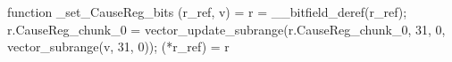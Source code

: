 function _set_CauseReg_bits (r_ref, v) = {
    r = __bitfield_deref(r_ref);
    r.CauseReg_chunk_0 = vector_update_subrange(r.CauseReg_chunk_0, 31, 0, vector_subrange(v, 31, 0));
    (*r_ref) = r
}
